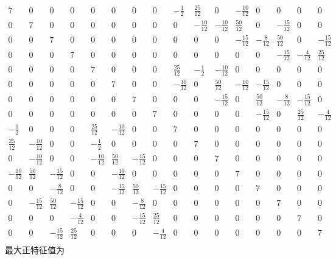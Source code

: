\documentclass[a4paper, 12pt]{article}
\begin{document}
\[
\begin{array}{cccccccccccccccc}
7 & 0 & 0 & 0 & 0 & 0 & 0 & 0 & -\frac{1}{2} & \frac{25}{12} & 0 & -\frac{10}{12} & 0 & 0 & 0 & 0 \\
0 & 7 & 0 & 0 & 0 & 0 & 0 & 0 & 0 & -\frac{10}{12} & -\frac{10}{12} & \frac{50}{12} & 0 & -\frac{15}{12} & 0 & 0 \\
0 & 0 & 7 & 0 & 0 & 0 & 0 & 0 & 0 & 0 & 0 & -\frac{15}{12} & -\frac{8}{12} & \frac{50}{12} & 0 & -\frac{15}{12} \\
0 & 0 & 0 & 7 & 0 & 0 & 0 & 0 & 0 & 0 & 0 & 0 & 0 & -\frac{15}{12} & -\frac{4}{12} & \frac{25}{12} \\
0 & 0 & 0 & 0 & 7 & 0 & 0 & 0 & \frac{25}{12} & -\frac{1}{2} & -\frac{10}{12} & 0 & 0 & 0 & 0 & 0 \\
0 & 0 & 0 & 0 & 0 & 7 & 0 & 0 & -\frac{10}{12} & 0 & \frac{50}{12} & -\frac{10}{12} & -\frac{15}{12} & 0 & 0 & 0 \\
0 & 0 & 0 & 0 & 0 & 0 & 7 & 0 & 0 & 0 & -\frac{15}{12} & 0 & \frac{50}{12} & -\frac{8}{12} & -\frac{15}{12} & 0 \\
0 & 0 & 0 & 0 & 0 & 0 & 0 & 7 & 0 & 0 & 0 & 0 & -\frac{15}{12} & 0 & \frac{25}{12} & -\frac{4}{12} \\
-\frac{1}{2} & 0 & 0 & 0 & \frac{25}{12} & -\frac{10}{12} & 0 & 0 & 7 & 0 & 0 & 0 & 0 & 0 & 0 & 0 \\
\frac{25}{12} & -\frac{10}{12} & 0 & 0 & -\frac{1}{2} & 0 & 0 & 0 & 0 & 7 & 0 & 0 & 0 & 0 & 0 & 0 \\
0 & -\frac{10}{12} & 0 & 0 & -\frac{10}{12} & \frac{50}{12} & -\frac{15}{12} & 0 & 0 & 0 & 7 & 0 & 0 & 0 & 0 & 0 \\
-\frac{10}{12} & \frac{50}{12} & -\frac{15}{12} & 0 & 0 & -\frac{10}{12} & 0 & 0 & 0 & 0 & 0 & 7 & 0 & 0 & 0 & 0 \\
0 & 0 & -\frac{8}{12} & 0 & 0 & -\frac{15}{12} & \frac{50}{12} & -\frac{15}{12} & 0 & 0 & 0 & 0 & 7 & 0 & 0 & 0 \\

0 & -\frac{15}{12} & \frac{50}{12} & -\frac{15}{12} & 0 & 0 & -\frac{8}{12} & 0 & 0 & 0 & 0 & 0 & 0 & 7 & 0 & 0 \\
0 & 0 & 0 & -\frac{4}{12} & 0 & 0 & -\frac{15}{12} & \frac{25}{12} & 0 & 0 & 0 & 0 & 0 & 0 & 7 & 0 \\
0 & 0 & -\frac{15}{12} & \frac{25}{12} & 0 & 0 & 0 & -\frac{4}{12} & 0 & 0 & 0 & 0 & 0 & 0 & 0 & 7 \\
\end{array}
\]
最大正特征值为
\end{document}
